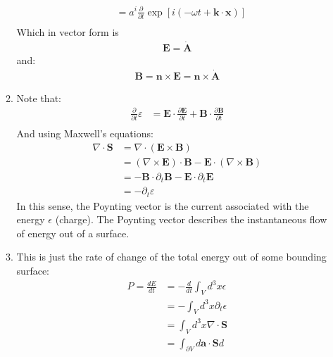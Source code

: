 \documentclass[12pt,a4]{article}
\begin{document}
\begin{enumerate}
\begin{enumerate}
\begin{align*}
                &=  a^i \frac{\partial}{\partial t} \exp[i(-\omega t + \mathbf{k}\cdot \mathbf{x})]\\
        \end{align*}
        Which in vector form is
        \begin{align*}
          \mathbf{E} = \dot{\mathbf{ A}}
        \end{align*}
        and:
        \begin{align*}
          \mathbf{B} = \mathbf{n} \times \mathbf{E} = \mathbf{n} \times \dot{\mathbf{ A}}
        \end{align*}
      \item
        Note that:
        \begin{align*}
          \frac{\partial}{\partial t} \varepsilon &= \mathbf{E} \cdot \frac{\partial \mathbf{E}}{\partial t} + \mathbf{B} \cdot \frac{\partial \mathbf{B}}{\partial t}\\
        \end{align*}          
        And using Maxwell's equations:
        \begin{align*}
          \nabla \cdot \mathbf{S} &=
          \nabla \cdot \left(\mathbf{E} \times \mathbf{B} \right) \\
                                                  &= (\nabla \times \mathbf{E}) \cdot \mathbf{B} - \mathbf{E} \cdot (\nabla \times \mathbf{B})\\
                                                  &= - \mathbf{B} \cdot \partial_t \mathbf{B} - \mathbf{E} \cdot \partial_t \mathbf{E} \\
                                                  &= - \partial_t \varepsilon
        \end{align*}          
        In this sense, the Poynting vector is the current associated with the energy $\epsilon$ (charge).
        The Poynting vector describes the instantaneous flow of energy out of a surface.
      \item
        This is just the rate of change of the total energy out of some bounding surface:
        \begin{align*}
          P = \frac{d E}{dt} &= - \frac{d}{dt} \int_V d^3x \epsilon\\
                             &= - \int_V d^3x \partial_t \epsilon\\
                             &= \int_V d^3x \nabla \cdot \mathbf{S}\\
                             &= \int_{\partial V} d \mathbf{a} \cdot \mathbf{S} d

\end{align*}
\end{enumerate}
\end{enumerate}
\end{document}
